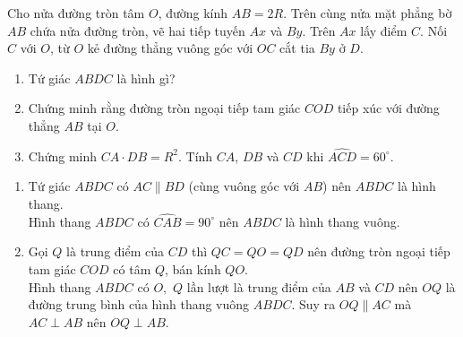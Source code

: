 \begin{bt}
Cho nửa đường tròn tâm $O$, đường kính $AB=2R$. Trên cùng nửa mặt phẳng bờ $AB$ chứa nửa đường tròn, vẽ hai tiếp tuyến $Ax$ và $By$. Trên $Ax$ lấy điểm $C$. Nối $C$ với $O$, từ $O$ kẻ đường thẳng vuông góc với $OC$ cắt tia $By$ ở $D$.
\begin{enumerate}
\item Tứ giác $ABDC$ là hình gì?
\item Chứng minh rằng đường tròn ngoại tiếp tam giác $COD$ tiếp xúc với đường thẳng $AB$ tại $O$.
\item Chứng minh $CA \cdot DB =R^2.$ Tính $CA$, $DB$ và $CD$ khi $\widehat{ACD}=60^{\circ}.$
\end{enumerate}
\loigiai
{
\begin{center}
\end{center}
\begin{enumerate}
\item Tứ giác $ABDC$ có $AC \parallel BD$ (cùng vuông góc với $AB$) nên $ABDC$ là hình thang.\\
Hình thang $ABDC$ có $\widehat{CAB}=90^{\circ}$ nên $ABDC$ là hình thang vuông.
\item Gọi $Q$ là trung điểm của $CD$ thì $QC=QO=QD$ nên đường tròn ngoại tiếp tam giác $COD$ có tâm $Q$, bán kính $QO$.\\
Hình thang $ABDC$ có $O,$ $Q$ lần lượt là trung điểm của $AB$ và $CD$ nên $OQ$ là đường trung bình của hình thang vuông $ABDC$. Suy ra $OQ \parallel AC$ mà $AC \perp AB$ nên $OQ \perp AB$.\\

\end{enumerate}}
\end{bt}
